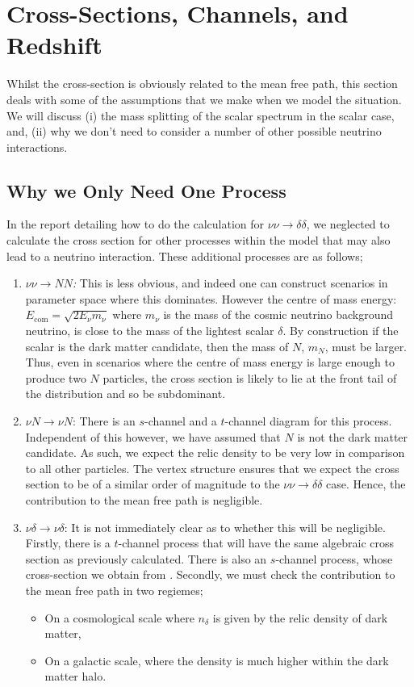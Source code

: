 \documentclass[10pt]{article}
\begin{document}
\section{Cross-Sections, Channels, and Redshift}
Whilst the cross-section is obviously related to the mean free path, this section deals with some of the assumptions that we make when we model the situation. We will discuss (i) the mass splitting of the scalar spectrum in the scalar case, and, (ii) why we don't need to consider a number of other possible neutrino interactions.
\subsection{Why we Only Need One Process}
In the report detailing how to do the calculation for $\nu\nu \rightarrow \delta\delta$, we neglected to calculate the cross section for other processes within the model that may also lead to a neutrino interaction. These additional processes are as follows;
\begin{enumerate}
  \item \textit{$\nu\nu \rightarrow NN$:} This is less obvious, and indeed one can construct scenarios in parameter space where this dominates. However the centre of mass energy: $E_{\mathrm{com}} = \sqrt{2 E_\nu m_\nu}$ where $m_\nu$ is the mass of the cosmic neutrino background neutrino, is close to the mass of the lightest scalar $\delta$. By construction if the scalar is the dark matter candidate, then the mass of $N$, $m_N$, must be larger. Thus, even in scenarios where the centre of mass energy is large enough to produce two $N$ particles, the cross section is likely to lie at the front tail of the distribution and so be subdominant.
  \item $\nu N \rightarrow \nu N$: There is an $s$-channel and a $t$-channel diagram for this process. Independent of this however, we have assumed that $N$ is not the dark matter candidate. As such, we expect the relic density to be very low in comparison to all other particles. The vertex structure ensures that we expect the cross section to be of a similar order of magnitude to the $\nu\nu \rightarrow \delta\delta$ case. Hence, the contribution to the mean free path is negligible.
  \item $\nu\delta \rightarrow \nu\delta$: It is not immediately clear as to whether this will be negligible. Firstly, there is a $t$-channel process that will have the same algebraic cross section as previously calculated. There is also an $s$-channel process, whose cross-section we obtain from \cite{Franarin2018}. Secondly, we must check the contribution to the mean free path in two regiemes;
  \begin{itemize}
    \item On a cosmological scale where $n_\delta$ is given by the relic density of dark matter,
    \item On a galactic scale, where the density is much higher within the dark matter halo.
  \end{itemize}
\end{enumerate}
\end{document}
